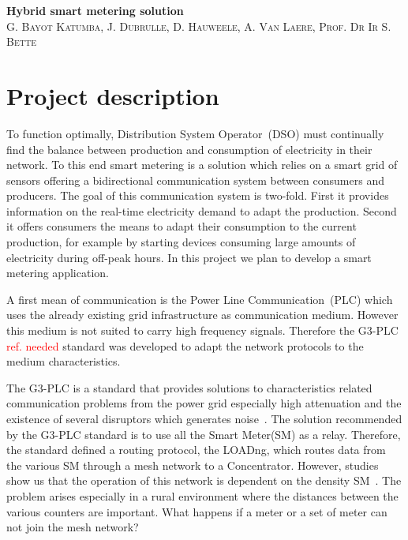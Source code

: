 \documentclass[a4paper,10pt]{article}
\newcommand{\FIXME}[1]{\textcolor{red}{\framebox{FIXME:} #1}}
\begin{document}

\begin{center}
  \huge\textbf{Hybrid smart metering solution}\\
  \vspace{0.5em}
  \small\textsc{G. Bayot Katumba, J. Dubrulle, D. Hauweele, A. Van Laere, Prof. Dr Ir S. Bette}
\end{center}

\section{Project description}

To function optimally, Distribution System Operator~(DSO)
must continually find the balance between production and
consumption of electricity in their network. To this end
smart metering is a solution which relies on a smart grid of
sensors offering a bidirectional communication system
between consumers and producers. The goal of this
communication system is two-fold. First it provides
information on the real-time electricity demand to adapt the
production. Second it offers consumers the means to adapt
their consumption to the current production, for example by
starting devices consuming large amounts of electricity
during off-peak hours. In this project we plan to develop a
smart metering application.

A first mean of communication is the Power Line
Communication~(PLC) which uses the already existing grid
infrastructure as communication medium. However this medium
is not suited to carry high frequency signals. Therefore the
G3-PLC\FIXME{ref. needed} standard was developed to adapt the network protocols
to the medium characteristics.

The G3-PLC is a standard that provides solutions to
characteristics related communication problems from the
power grid especially high attenuation and the existence of
several disruptors which generates noise~\cite{itu_sim2016}. The solution recommended by
the G3-PLC standard is to use all the Smart Meter(SM) as a
relay. Therefore, the standard defined a routing protocol,
the LOADng, which routes data from the various SM through a
mesh network to a Concentrator. However, studies show us
that the operation of this network is dependent on the
density SM~\cite{g3plc_density2015}. The problem
arises especially in a rural environment where the distances
between the various counters are important. What happens if
a meter or a set of meter can not join the mesh network?
\end{document}

